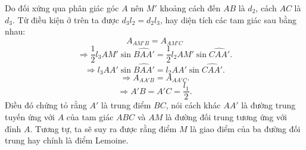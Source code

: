 \begin{enumerate}[label=(\alph*)]
\begin{enumerate}[label=(\roman*)]
    Do đối xứng qua phân giác góc $A$ nên $M'$ khoảng cách đến $AB$ là $d_2$, cách $AC$ là $d_3$. Từ điều kiện ở trên ta được $d_3l_2=d_2l_3$, hay diện tích các tam giác sau bằng nhau: 
    \begin{equation}
    A_{AM'B}=A_{AM'C}
    \end{equation}
    \begin{equation}
    \Longrightarrow 
    \dfrac{1}{2}l_3AM'\sin{\widehat{BAA'}}=\dfrac{1}{2}l_2AM'\sin{\widehat{CAA'}}.
    \end{equation}
    \begin{equation}
    \Longrightarrow l_3AA'\sin{\widehat{BAA'}}=l_2AA'\sin{\widehat{CAA'}}.
    \end{equation}
    \begin{equation}
    \Longrightarrow A_{AA'B}=A_{AA'C}.
    \end{equation}
    \begin{equation}
    \Longrightarrow A'B=A'C=\dfrac{l_1}{2}.
    \end{equation}
    Điều đó chứng tỏ rằng $A'$ là trung điểm $BC$, nói cách khác $AA'$ là đường trung tuyến ứng với $A$ của tam giác $ABC$ và $AM$ là đường đối trung tương ứng với đỉnh $A$. Tương tự, ta sẽ suy ra được rằng điểm $M$ là giao điểm của ba đường đối trung hay chính là điểm Lemoine.

    
    \end{enumerate}
\end{enumerate}

